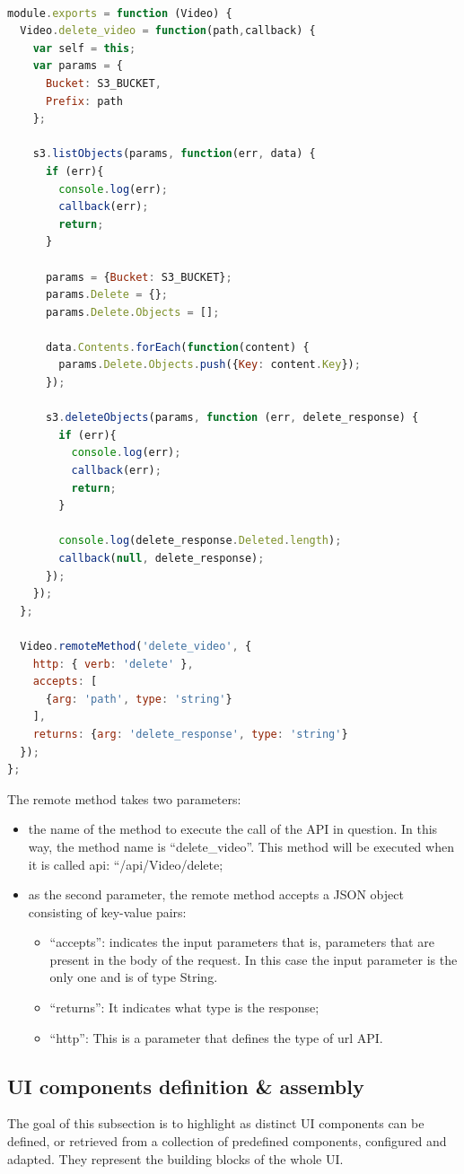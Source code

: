\begin{lstlisting}[language=javascript]

module.exports = function (Video) {
  Video.delete_video = function(path,callback) {
    var self = this;
    var params = {
      Bucket: S3_BUCKET,
      Prefix: path
    };

    s3.listObjects(params, function(err, data) {
      if (err){
        console.log(err);
        callback(err);
        return;
      } 

      params = {Bucket: S3_BUCKET};
      params.Delete = {};
      params.Delete.Objects = [];

      data.Contents.forEach(function(content) {
        params.Delete.Objects.push({Key: content.Key});
      });

      s3.deleteObjects(params, function (err, delete_response) {
        if (err){
          console.log(err);
          callback(err);
          return;
        }

        console.log(delete_response.Deleted.length);
        callback(null, delete_response);
      });
    });
  };

  Video.remoteMethod('delete_video', {
    http: { verb: 'delete' },
    accepts: [
      {arg: 'path', type: 'string'}
    ],
    returns: {arg: 'delete_response', type: 'string'}
  });
};
\end{lstlisting}

The remote method takes two parameters:
\begin{itemize}
\item the name of the method to execute the call of the API in question. In this way, the method name is “delete\_video”. This method will be executed when it is called api: “/api/Video/delete;
\item as the second parameter, the remote method accepts a JSON object consisting of key-value pairs:
  \begin{itemize}
    \item “accepts”: indicates the input parameters that is, parameters that are present in the body of the request. In this case the input parameter is the only one and is of type String.
    \item “returns”: It indicates what type is the response;
    \item “http”: This is a parameter that defines the type of url API.
  \end{itemize}
\end{itemize}


\subsection {UI components definition \& assembly}
\label{subsec:components_definition}
The goal of this subsection is to highlight as distinct UI components can be defined, or retrieved from a collection of predefined components, configured and adapted. They represent the building blocks of the whole UI.

